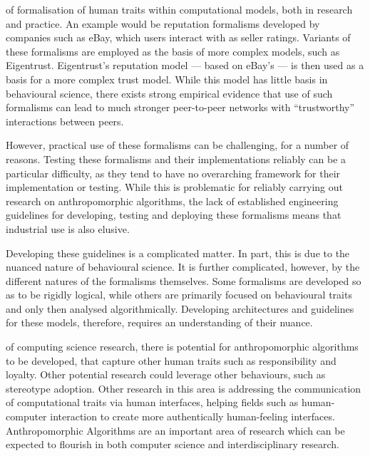  of formalisation of human traits within computational models, both in research and practice. An example would be reputation formalisms developed by companies such as eBay, which users interact with as seller ratings. Variants of these formalisms are employed as the basis of more complex models, such as Eigentrust\cite{kamvar2003eigentrust}. Eigentrust's reputation model --- based on eBay's --- is then used as a basis for a more complex trust model. While this model has little basis in behavioural science, there exists strong empirical evidence that use of such formalisms can lead to much stronger peer-to-peer networks with ``trustworthy'' interactions between peers.\par

However, practical use of these formalisms can be challenging, for a number of reasons. Testing these formalisms and their implementations reliably can be a particular difficulty, as they tend to have no overarching framework for their implementation or testing\cite{Chandrasekaran2011}. While this is problematic for reliably carrying out research on anthropomorphic algorithms, the lack of established engineering guidelines for developing, testing and deploying these formalisms means that industrial use is also elusive.\par

Developing these guidelines is a complicated matter. In part, this is due to the nuanced nature of behavioural science. It is further complicated, however, by the different natures of the formalisms themselves. Some formalisms are developed so as to be rigidly logical\cite{Castelfranchi}, while others are primarily focused on behavioural traits and only then analysed algorithmically\cite{marsh1994}. Developing architectures and guidelines for these models, therefore, requires an understanding of their nuance.\par

 of computing science research, there is potential for anthropomorphic algorithms to be developed, that capture other human traits such as responsibility and loyalty. Other potential research could leverage other behaviours, such as stereotype adoption. Other research in this area is addressing the communication of computational traits via human interfaces\cite{marsh2014foreground}, helping fields such as human-computer interaction to create more authentically human-feeling interfaces. Anthropomorphic Algorithms are an important area of research which can be expected to flourish in both computer science and interdisciplinary research.\par

